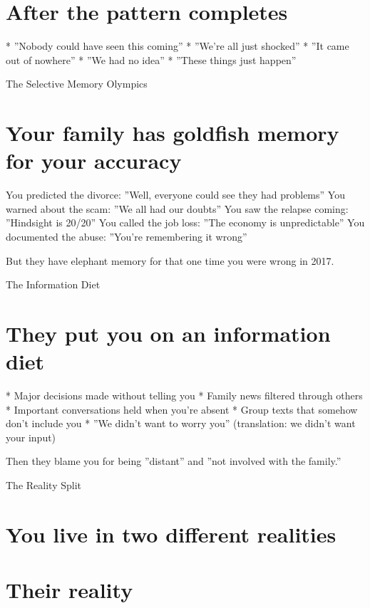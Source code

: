 \documentclass[12pt,oneside]{book}
\begin{document}
\section{After the pattern completes}

                    * ''Nobody could have seen this coming''
                    * ''We're all just shocked''
                    * ''It came out of nowhere''
                    * ''We had no idea''
                    * ''These things just happen''

The Selective Memory Olympics

\section{Your family has goldfish memory for your accuracy}

You predicted the divorce: ''Well, everyone could see they had problems'' You warned about the scam: ''We all had our doubts'' You saw the relapse coming: ''Hindsight is 20/20'' You called the job loss: ''The economy is unpredictable'' You documented the abuse: ''You're remembering it wrong''

But they have elephant memory for that one time you were wrong in 2017.

The Information Diet

\section{They put you on an information diet}

                    * Major decisions made without telling you
                    * Family news filtered through others
                    * Important conversations held when you're absent
                    * Group texts that somehow don't include you
                    * ''We didn't want to worry you'' (translation: we didn't want your input)

Then they blame you for being ''distant'' and ''not involved with the family.''

The Reality Split

\section{You live in two different realities}

\section{Their reality}
\end{document}
